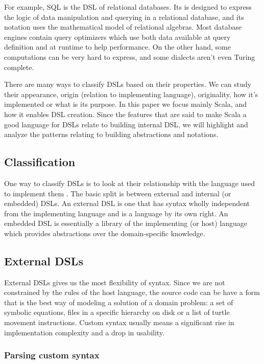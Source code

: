 For example, SQL is the DSL of relational databases. Its is designed to express the logic of data manipulation and querying in a relational database, and its notation uses the mathematical model of relational algebras. Most database engines contain query optimizers which use both data available at query definition and at runtime to help performance. On the other hand, some computations can be very hard to express, and some dialects aren't even Turing complete.

There are many ways to classify DSLs \autocite{Gunther:2011} based on their properties. We can study their appearance, origin (relation to implementing language), originality, how it's implemented or what is its purpose. In this paper we focus mainly Scala, and how it enables DSL creation. Since the features that are said to make Scala a good language for DSLs relate to building internal DSL, we will highlight and analyze the patterns relating to building abstractions and notations.

\subsection{Classification}
One way to classify DSLs is to look at their relationship with the language used to implement them \autocite{Artho:2015, Gunther:2011}. The basic split is between external and internal (or embedded) DSLs. An external DSL is one that has syntax wholly independent from the implementing language and is a language by its own right. An embedded DSL is essentially a library of the implementing (or host) language which provides abstractions over the domain-specific knowledge.

\subsection{External DSLs}

External DSLs gives us the most flexibility of syntax. Since we are not constrained by the rules of the host language, the source code can be have a form that is the best way of modeling a solution of a domain problem: a set of symbolic equations, files in a specific hierarchy on disk or a list of turtle movement instructions. Custom syntax usually means a significant rise in implementation complexity and a drop in usability. 

\subsubsection{Parsing custom syntax}

